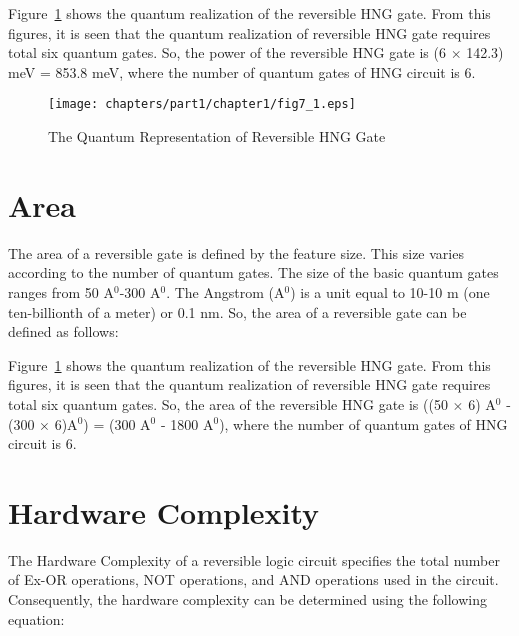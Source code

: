 \begin{example}\textnormal{
	Figure~\ref{fig:p1_c1_fig7_1} shows the quantum realization of the reversible HNG gate. From this figures, it is seen that the quantum realization of reversible HNG gate requires total six quantum gates. So, the power of the reversible HNG gate is (6 $\times$ 142.3) meV = 853.8 meV, where the number of quantum gates of HNG circuit is 6.}
\end{example}


\begin{figure}[H]
	\centering
	\texttt{[image: chapters/part1/chapter1/fig7\_1.eps]}
	\caption{The Quantum Representation of Reversible HNG Gate}
	\label{fig:p1_c1_fig7_1}
\end{figure}

\section{Area}
The area of a  reversible gate is defined by the feature size. This size varies according to the number of quantum gates. The size of the basic quantum gates ranges from 50 A$^0$-300 A$^0$. The Angstrom (A$^0$) is a unit equal to 10-10 m (one ten-billionth of a meter) or 0.1 nm. So, the area of a reversible gate can be defined as follows: 


\begin{example}\textnormal{
	Figure~\ref{fig:p1_c1_fig7_1} shows the quantum realization of the reversible HNG gate. From this figures, it is seen that the quantum realization of reversible HNG gate requires total six quantum gates. So, the area of the reversible HNG gate is ((50 $\times$ 6) A$^0$ - (300 $\times$ 6)A$^0$) = (300 A$^0$ - 1800 A$^0$), where the number of quantum gates of HNG circuit is 6.}
\end{example} 



\section{Hardware Complexity}
The Hardware Complexity of a reversible logic circuit specifies the total number of Ex-OR operations, NOT operations, and AND operations used in the circuit. Consequently, the hardware complexity can be determined using the following equation:

